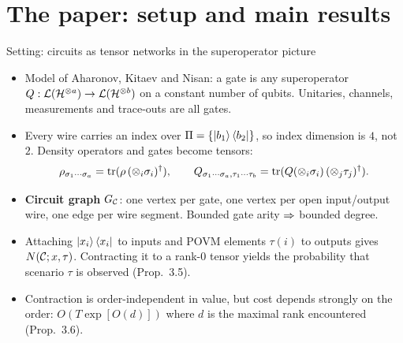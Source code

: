\section{The paper: setup and main results}

\begin{frame}{Setting: circuits as tensor networks in the superoperator picture}
    \begin{itemize}
        \item Model of Aharonov, Kitaev and Nisan: a gate is any superoperator $Q:\mathcal{L}(\mathcal{H}^{\otimes a})\rightarrow\mathcal{L}(\mathcal{H}^{\otimes b})$ on a constant number of qubits. Unitaries, channels, measurements and trace-outs are all gates.
        \item Every wire carries an index over $\Pi=\{\ket{b_1}\bra{b_2}\}$, so index dimension is $4$, not $2$. Density operators and gates become tensors:
        \[
            \rho_{\sigma_1\cdots\sigma_a}=\tr\rbcs{\rho\,(\otimes_i\sigma_i)^\dagger},\qquad
            Q_{\sigma_1\cdots\sigma_a,\tau_1\cdots\tau_b}=\tr\rbcs{Q(\otimes_i\sigma_i)\,(\otimes_j\tau_j)^\dagger}.
        \]
        \item \textbf{Circuit graph} $G_{\mathcal{C}}$: one vertex per gate, one vertex per open input/output wire, one edge per wire segment. Bounded gate arity $\Rightarrow$ bounded degree.
        \item Attaching $\ket{x_i}\bra{x_i}$ to inputs and POVM elements $\tau(i)$ to outputs gives $N(\mathcal{C};x,\tau)$. Contracting it to a rank-0 tensor yields the probability that scenario $\tau$ is observed (Prop.~3.5).
        \item Contraction is order-independent in value, but cost depends strongly on the order: $O(T\exp[O(d)])$ where $d$ is the maximal rank encountered (Prop.~3.6).
    \end{itemize}
\end{frame}

